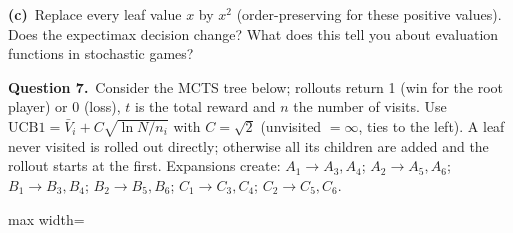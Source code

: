 \documentclass[11pt,a4paper]{article}
\newcommand{\question}[1]{\par\medskip\noindent\textbf{Question #1.}\ }
\newcommand{\subq}[1]{\par\smallskip\noindent\textbf{#1}\ }
\begin{document}
\subq{(c)}Replace every leaf value $x$ by $x^2$ (order-preserving for these positive values). Does the expectimax decision change? What does this tell you about evaluation functions in stochastic games?
\begin{ansbox}[height=1.8cm]\end{ansbox}
\clearpage
\question{7}Consider the MCTS tree below; rollouts return 1 (win for the root player) or 0 (loss), $t$ is the total reward and $n$ the number of visits. Use $\mathrm{UCB1}=\bar V_i + C\sqrt{\ln N/n_i}$ with $C=\sqrt2$ (unvisited $=\infty$, ties to the left). A leaf never visited is rolled out directly; otherwise all its children are added and the rollout starts at the first. Expansions create: $A_1\to A_3,A_4$; $A_2\to A_5,A_6$; $B_1\to B_3,B_4$; $B_2\to B_5,B_6$; $C_1\to C_3,C_4$; $C_2\to C_5,C_6$.\begin{center}
\begin{adjustbox}{max width=\linewidth}
\end{adjustbox}
\end{center}
\end{document}
